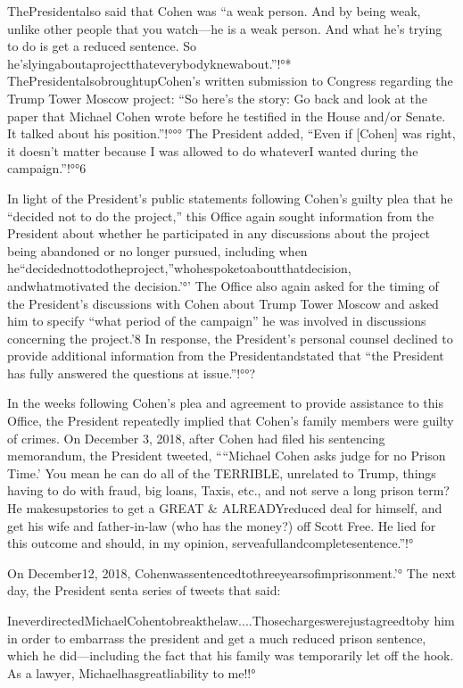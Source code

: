 ThePresidentalso said that Cohen was “a weak person. And by being weak, unlike other people that you watch—he is a weak person. And what he's trying to do is get a reduced sentence. So he'slyingaboutaprojectthateverybodyknewabout.”!°* ThePresidentalsobroughtupCohen's written submission to Congress regarding the Trump Tower Moscow project: “So here's the story: Go back and look at the paper that Michael Cohen wrote before he testified in the House and/or Senate. It talked about his position.”!°°° The President added, “Even if [Cohen] was right, it doesn't matter because I was allowed to do whateverI wanted during the campaign.”!°°6

In light of the President's public statements following Cohen's guilty plea that he “decided not to do the project,” this Office again sought information from the President about whether he participated in any discussions about the project being abandoned or no longer pursued, including when he“decidednottodotheproject,”whohespoketoaboutthatdecision, andwhatmotivated
the decision.'°' The Office also again asked for the timing of the President's discussions with Cohen about Trump Tower Moscow and asked him to specify “what period of the campaign” he was involved in discussions concerning the project.'8 In response, the President's personal counsel declined to provide additional information from the Presidentandstated that “the President has fully answered the questions at issue.”!°°?

In the weeks following Cohen's plea and agreement to provide assistance to this Office, the President repeatedly implied that Cohen's family members were guilty of crimes. On December 3, 2018, after Cohen had filed his sentencing memorandum, the President tweeted, ““Michael Cohen asks judge for no Prison Time.' You mean he can do all of the TERRIBLE, unrelated to Trump, things having to do with fraud, big loans, Taxis, etc., and not serve a long prison term? He makesupstories to get a GREAT & ALREADYreduced deal for himself, and get his wife and father-in-law (who has the money?) off Scott Free. He lied for this outcome and should, in my opinion, serveafullandcompletesentence.”!° 

On December12, 2018, Cohenwassentencedtothreeyearsofimprisonment.'° The next day, the President senta series of tweets that said:

IneverdirectedMichaelCohentobreakthelaw....Thosechargeswerejustagreedtoby him in order to embarrass the president and get a much reduced prison sentence, which he did—including the fact that his family was temporarily let off the hook. As a lawyer, Michaelhasgreatliability to me!!°

